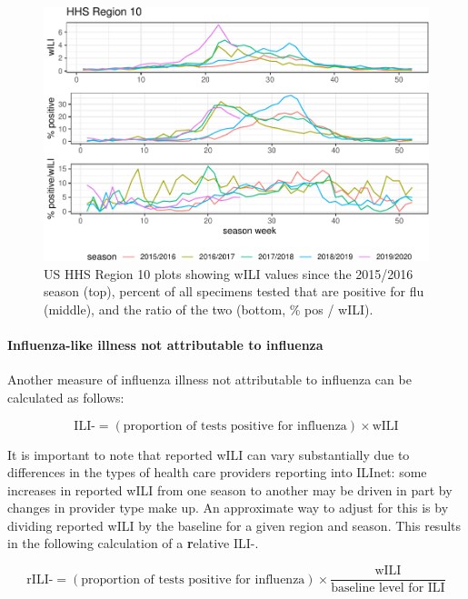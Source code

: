 \documentclass[]{article}
\let\oldparagraph\paragraph
\renewcommand{\paragraph}[1]{\oldparagraph{#1}\mbox{}}
\begin{document}
\begin{figure}
\centering
\includegraphics{ili-labtest-report_files/figure-latex/region10-plot-1.pdf}
\caption{\label{fig:region10-plot}US HHS Region 10 plots showing wILI
values since the 2015/2016 season (top), percent of all specimens tested
that are positive for flu (middle), and the ratio of the two (bottom, \%
pos / wILI).}
\end{figure}

\hypertarget{influenza-like-illness-not-attributable-to-influenza}{%
\paragraph{Influenza-like illness not attributable to
influenza}\label{influenza-like-illness-not-attributable-to-influenza}}

Another measure of influenza illness not attributable to influenza can
be calculated as follows:

\[\text{ILI-} = (\text{proportion of tests positive for influenza}) \times \text{wILI}\]

It is important to note that reported wILI can vary substantially due to
differences in the types of health care providers reporting into ILInet:
some increases in reported wILI from one season to another may be driven
in part by changes in provider type make up. An approximate way to
adjust for this is by dividing reported wILI by the baseline for a given
region and season. This results in the following calculation of a
\textbf{r}elative ILI-.

\[\text{rILI-} = (\text{proportion of tests positive for influenza}) \times \frac{\text{wILI}}{\text{baseline level for ILI}}\]
\end{document}
